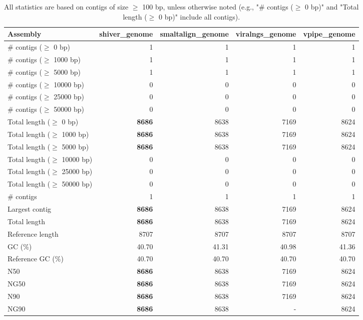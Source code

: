 \documentclass[12pt,a4paper]{article}
\begin{document}
\begin{table}[ht]
\begin{center}
\caption{All statistics are based on contigs of size $\geq$ 100 bp, unless otherwise noted (e.g., "\# contigs ($\geq$ 0 bp)" and "Total length ($\geq$ 0 bp)" include all contigs).}
\begin{tabular}{|l*{4}{|r}|}
\hline
Assembly & shiver\_genome & smaltalign\_genome & viralngs\_genome & vpipe\_genome \\ \hline
\# contigs ($\geq$ 0 bp) & 1 & 1 & 1 & 1 \\ \hline
\# contigs ($\geq$ 1000 bp) & 1 & 1 & 1 & 1 \\ \hline
\# contigs ($\geq$ 5000 bp) & 1 & 1 & 1 & 1 \\ \hline
\# contigs ($\geq$ 10000 bp) & 0 & 0 & 0 & 0 \\ \hline
\# contigs ($\geq$ 25000 bp) & 0 & 0 & 0 & 0 \\ \hline
\# contigs ($\geq$ 50000 bp) & 0 & 0 & 0 & 0 \\ \hline
Total length ($\geq$ 0 bp) & {\bf 8686} & 8638 & 7169 & 8624 \\ \hline
Total length ($\geq$ 1000 bp) & {\bf 8686} & 8638 & 7169 & 8624 \\ \hline
Total length ($\geq$ 5000 bp) & {\bf 8686} & 8638 & 7169 & 8624 \\ \hline
Total length ($\geq$ 10000 bp) & 0 & 0 & 0 & 0 \\ \hline
Total length ($\geq$ 25000 bp) & 0 & 0 & 0 & 0 \\ \hline
Total length ($\geq$ 50000 bp) & 0 & 0 & 0 & 0 \\ \hline
\# contigs & 1 & 1 & 1 & 1 \\ \hline
Largest contig & {\bf 8686} & 8638 & 7169 & 8624 \\ \hline
Total length & {\bf 8686} & 8638 & 7169 & 8624 \\ \hline
Reference length & 8707 & 8707 & 8707 & 8707 \\ \hline
GC (\%) & 40.70 & 41.31 & 40.98 & 41.36 \\ \hline
Reference GC (\%) & 40.70 & 40.70 & 40.70 & 40.70 \\ \hline
N50 & {\bf 8686} & 8638 & 7169 & 8624 \\ \hline
NG50 & {\bf 8686} & 8638 & 7169 & 8624 \\ \hline
N90 & {\bf 8686} & 8638 & 7169 & 8624 \\ \hline
NG90 & {\bf 8686} & 8638 & - & 8624 \\ \hline

\end{tabular}
\end{center}
\end{table}
\end{document}
